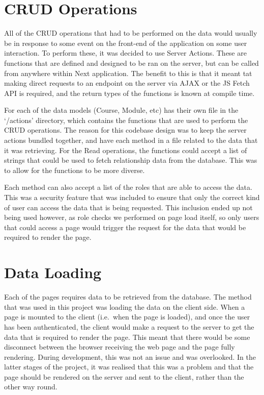 \documentclass[11pt, a4paper,twoside]{report}
\theoremstyle{plain} %
\theoremstyle{definition} %
\numberwithin{equation}{chapter}
\begin{document}
\section{CRUD Operations}\label{sec:crudoperations}

All of the CRUD operations that had to be performed on the data would usually
be in response to some event on the front-end of the application on some user
interaction. To perform these, it was decided to use Server Actions. These are
functions that are defined and designed to be ran on the server, but can be
called from anywhere within Next application. The benefit to this is that it
meant tat making direct requests to an endpoint on the server via AJAX or the
JS Fetch API is required, and the return types of the functions is known at
compile time.

For each of the data models (Course, Module, etc) has their own file in the
`/actions' directory, which contains the functions that are used to perform the
CRUD operations. The reason for this codebase design was to keep the server
actions bundled together, and have each method in a file related to the data
that it was retrieving. For the Read operations, the functions could accept a
list of strings that could be used to fetch relationship data from the
database. This was to allow for the functions to be more diverse.

Each method can also accept a list of the roles that are able to access the
data. This was a security feature that was included to ensure that only the
correct kind of user can access the data that is being requested. This
inclusion ended up not being used however, as role checks we performed on
page load itself, so only users that could access a page would trigger the
request for the data that would be required to render the page.

\section{Data Loading}\label{sec:dataloading}

Each of the pages requires data to be retrieved from the database. The method
that was used in this project was loading the data on the client side. When a
page is mounted to the client (i.e.\ when the page is loaded), and once the
user has been authenticated, the client would make a request to the server to
get the data that is required to render the page. This meant that there would
be some disconnect between the browser receiving the web page and the page
fully rendering. During development, this was not an issue and was overlooked.
In the latter stages of the project, it was realised that this was a problem
and that the page should be rendered on the server and sent to the client,
rather than the other way round.
\end{document}

